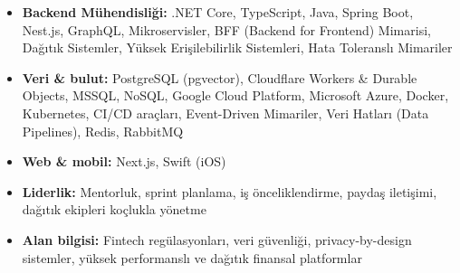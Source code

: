 \begin{itemize}
  \item \textbf{Backend Mühendisliği:} .NET Core, TypeScript, Java, Spring Boot, Nest.js, GraphQL, Mikroservisler, BFF (Backend for Frontend) Mimarisi, Dağıtık Sistemler, Yüksek Erişilebilirlik Sistemleri, Hata Toleranslı Mimariler
  \item \textbf{Veri \& bulut:} PostgreSQL (pgvector), Cloudflare Workers \& Durable Objects, MSSQL, NoSQL, Google Cloud Platform, Microsoft Azure, Docker, Kubernetes, CI/CD araçları, Event-Driven Mimariler, Veri Hatları (Data Pipelines), Redis, RabbitMQ
  \item \textbf{Web \& mobil:} Next.js, Swift (iOS)
  \item \textbf{Liderlik:} Mentorluk, sprint planlama, iş önceliklendirme, paydaş iletişimi, dağıtık ekipleri koçlukla yönetme
  \item \textbf{Alan bilgisi:} Fintech regülasyonları, veri güvenliği, privacy-by-design sistemler, yüksek performanslı ve dağıtık finansal platformlar
\end{itemize}

